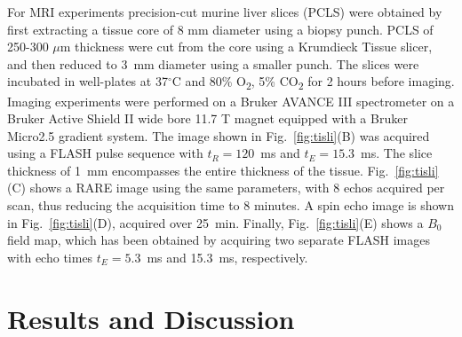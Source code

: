 \documentclass[preprint,5p]{elsarticle}
\newcommand{\fig}[1]{Fig.~\ref{#1}}
\begin{document}
For MRI experiments precision-cut murine liver slices (PCLS) were obtained by first extracting a
tissue core of 8 mm diameter using a biopsy punch. PCLS of 250-300 $\mu$m
thickness were cut from the core using a Krumdieck Tissue slicer, and then
reduced to 3~mm diameter using a smaller punch. The slices were incubated in
well-plates at 37$^\circ$C and 80\% O\textsubscript{2}, 5\% CO\textsubscript{2}
for 2 hours before imaging. Imaging experiments were performed on a Bruker
AVANCE III spectrometer on a Bruker Active Shield II wide bore 11.7 T magnet equipped with a Bruker Micro2.5 gradient system. The image shown in \fig{fig:tisli}(B) was acquired using a FLASH pulse sequence with $t_R=120$~ms and $t_E=15.3$~ms. The slice thickness of  1~mm encompasses the entire thickness of the tissue. \fig{fig:tisli}(C) shows a
RARE image using the same parameters, with 8 echos acquired per scan, thus
reducing the acquisition time to 8 minutes. A spin echo image is shown in
\fig{fig:tisli}(D), acquired over 25~min. Finally, \fig{fig:tisli}(E) shows a
$B_0$ field map, which has been obtained by acquiring two separate FLASH images
with echo times $t_E=5.3$~ms and 15.3~ms, respectively.
\cbend


\section{Results and Discussion}
\end{document}
